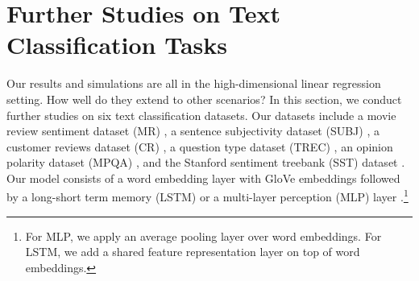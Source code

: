 \section{Further Studies on Text Classification Tasks}\label{sec_text}

Our results and simulations are all in the high-dimensional linear regression setting.
How well do they extend to other scenarios?
In this section, we conduct further studies on six text classification datasets.
Our datasets include a movie review sentiment dataset (MR) \cite{pang2005seeing}, a sentence subjectivity dataset (SUBJ) \cite{pang2004sentimental}, a customer reviews dataset (CR) \cite{hu2004mining}, a question type dataset (TREC) \cite{li2002learning}, an opinion polarity dataset (MPQA) \cite{wiebe2005annotating}, and the Stanford sentiment treebank (SST) dataset \cite{socher2013recursive}.
Our model consists of a word embedding layer with GloVe embeddings \cite{pennington2014glove} followed by a long-short term memory (LSTM) or a multi-layer perception (MLP) layer \cite{lei2018simple}.\footnote{For MLP, we apply an average pooling layer over word embeddings. For LSTM, we add a shared feature representation layer on top of word embeddings.}


